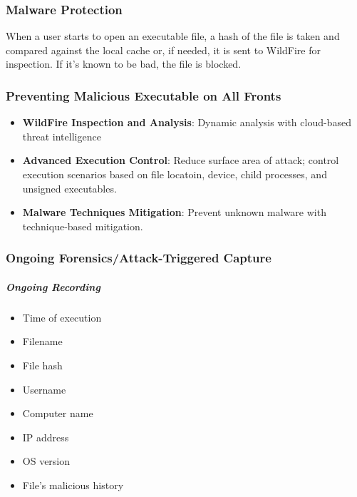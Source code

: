 \subsubsection{Malware Protection}
When a user starts to open an executable file, a hash of the file is taken and compared against the local cache or, if needed, it is sent to WildFire for inspection.
If it's known to be bad, the file is blocked.

\subsubsection{Preventing Malicious Executable on All Fronts}
\begin{itemize}
    \item \textbf{WildFire Inspection and Analysis}: Dynamic analysis with cloud-based threat intelligence
    \item \textbf{Advanced Execution Control}: Reduce surface area of attack; control execution scenarios based on file locatoin, device, child processes, and unsigned executables.
    \item \textbf{Malware Techniques Mitigation}: Prevent unknown malware with technique-based mitigation.
\end{itemize}

\subsubsection{Ongoing Forensics/Attack-Triggered Capture}
\subparagraph{Ongoing Recording}
    \begin{itemize}
        \item Time of execution
        \item Filename
        \item File hash
        \item Username
        \item Computer name
        \item IP address
        \item OS version
        \item File's malicious history
    \end{itemize}
    
